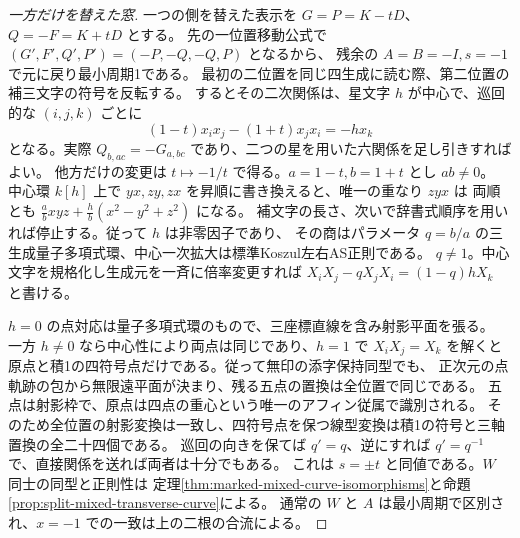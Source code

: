 \begin{proof}[一方だけを替えた窓]
一つの側を替えた表示を $G=P=K-tD$、$Q=-F=K+tD$ とする。
先の一位置移動公式で $(G',F',Q',P')=(-P,-Q,-Q,P)$ となるから、
残余の $A=B=-I,s=-1$ で元に戻り最小周期1である。
最初の二位置を同じ四生成に読む際、第二位置の補三文字の符号を反転する。
するとその二次関係は、星文字 $h$ が中心で、巡回的な $(i,j,k)$ ごとに
\[
             (1-t)x_i x_j-(1+t)x_jx_i=-h x_k
\]
となる。実際 $Q_{b,ac}=-G_{a,bc}$ であり、二つの星を用いた六関係を足し引きすればよい。
他方だけの変更は $t\mapsto-1/t$ で得る。$a=1-t,b=1+t$ とし $ab\ne0$。
中心環 $k[h]$ 上で $yx,zy,zx$ を昇順に書き換えると、唯一の重なり $zyx$ は
両順とも $\frac ab xyz+\frac hb(x^2-y^2+z^2)$ になる。
補文字の長さ、次いで辞書式順序を用いれば停止する。従って $h$ は非零因子であり、
その商はパラメータ $q=b/a$ の三生成量子多項式環、中心一次拡大は標準Koszul左右AS正則である。
$q\ne1$。中心文字を規格化し生成元を一斉に倍率変更すれば
$X_i X_j-q X_jX_i=(1-q)h X_k$ と書ける。

$h=0$ の点対応は量子多項式環のもので、三座標直線を含み射影平面を張る。
一方 $h\ne0$ なら中心性により両点は同じであり、$h=1$ で $X_i X_j=X_k$ を解くと
原点と積1の四符号点だけである。従って無印の添字保持同型でも、
正次元の点軌跡の包から無限遠平面が決まり、残る五点の置換は全位置で同じである。
五点は射影枠で、原点は四点の重心という唯一のアフィン従属で識別される。
そのため全位置の射影変換は一致し、四符号点を保つ線型変換は積1の符号と三軸置換の全二十四個である。
巡回の向きを保てば $q'=q$、逆にすれば $q'=q^{-1}$ で、直接関係を送れば両者は十分でもある。
これは $s=\pm t$ と同値である。$W$ 同士の同型と正則性は
定理\ref{thm:marked-mixed-curve-isomorphisms}と命題\ref{prop:split-mixed-transverse-curve}による。
通常の $W$ と $A$ は最小周期で区別され、$x=-1$ での一致は上の二根の合流による。
\end{proof}

